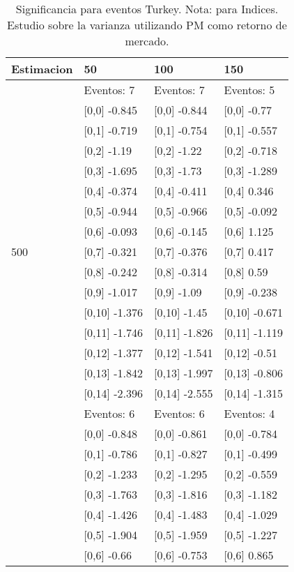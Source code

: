 \begin{table}

\caption{Significancia para eventos Turkey. Nota: para Indices. Estudio sobre la varianza utilizando PM como retorno de mercado.}
\centering
\begin{tabular}[t]{llll}
\toprule
Estimacion & 50 & 100 & 150\\
\midrule
 & Eventos:  7 & Eventos:  7 & Eventos:  5\\
 & {}[0,0] -0.845 & {}[0,0] -0.844 & {}[0,0] -0.77\\
 & {}[0,1] -0.719 & {}[0,1] -0.754 & {}[0,1] -0.557\\
 & {}[0,2] -1.19 & {}[0,2] -1.22 & {}[0,2] -0.718\\
 & {}[0,3] -1.695 & {}[0,3] -1.73 & {}[0,3] -1.289\\
\addlinespace
 & {}[0,4] -0.374 & {}[0,4] -0.411 & {}[0,4] 0.346\\
 & {}[0,5] -0.944 & {}[0,5] -0.966 & {}[0,5] -0.092\\
 & {}[0,6] -0.093 & {}[0,6] -0.145 & {}[0,6] 1.125\\
500 & {}[0,7] -0.321 & {}[0,7] -0.376 & {}[0,7] 0.417\\
 & {}[0,8] -0.242 & {}[0,8] -0.314 & {}[0,8] 0.59\\
\addlinespace
 & {}[0,9] -1.017 & {}[0,9] -1.09 & {}[0,9] -0.238\\
 & {}[0,10] -1.376 & {}[0,10] -1.45 & {}[0,10] -0.671\\
 & {}[0,11] -1.746 & {}[0,11] -1.826 & {}[0,11] -1.119\\
 & {}[0,12] -1.377 & {}[0,12] -1.541 & {}[0,12] -0.51\\
 & {}[0,13] -1.842 & {}[0,13] -1.997 & {}[0,13] -0.806\\
\addlinespace
 & {}[0,14] -2.396 & {}[0,14] -2.555 & {}[0,14] -1.315\\
 & Eventos:  6 & Eventos:  6 & Eventos:  4\\
 & {}[0,0] -0.848 & {}[0,0] -0.861 & {}[0,0] -0.784\\
 & {}[0,1] -0.786 & {}[0,1] -0.827 & {}[0,1] -0.499\\
 & {}[0,2] -1.233 & {}[0,2] -1.295 & {}[0,2] -0.559\\
\addlinespace
 & {}[0,3] -1.763 & {}[0,3] -1.816 & {}[0,3] -1.182\\
 & {}[0,4] -1.426 & {}[0,4] -1.483 & {}[0,4] -1.029\\
 & {}[0,5] -1.904 & {}[0,5] -1.959 & {}[0,5] -1.227\\
 & {}[0,6] -0.66 & {}[0,6] -0.753 & {}[0,6] 0.865\\

\end{tabular}
\end{table}
